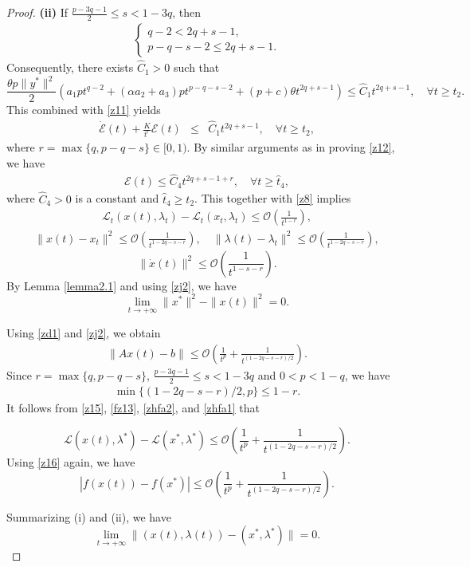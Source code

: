 \documentclass[review]{elsarticle}
\begin{document}
\begin{proof}
		{\bf (ii)} If $\frac{p-3q-1}{2}\leq s<1-3q$, then
		\begin{eqnarray*}
			\begin{cases}
				q-2<2q+s-1,\\
				p-q-s-2\leq2q+s-1.
			\end{cases}
		\end{eqnarray*} 
		Consequently, there exists $\widehat{C}_1>0$ such that
		$$\frac{\theta p\|y^*\|^2}{2}\left(a_1pt^{q-2}+(\alpha a_2+a_3)pt^{p-q-s-2}+(p+c)\theta t^{2q+s-1}\right)\leq \widehat{C}_1t^{2q+s-1}, \quad \forall t\geq t_2.$$
		This combined with \eqref{z11} yields 
		\begin{eqnarray*}
			\dot{\mathcal{E}}(t)+\frac{K}{t^r}\mathcal{E}(t)
			&\leq&\widehat{C}_1 t^{2q+s-1}, \quad \forall t\geq t_2,
		\end{eqnarray*}	
		where $r=\max\{q, p-q-s\}\in[0, 1)$.
		By   similar arguments as in proving \eqref{z12}, we  have 
		\begin{eqnarray*}
			\mathcal{E}(t)
			\leq\widehat{C}_4t^{2q+s-1+r}, \quad \forall t\geq \hat{t}_4,
		\end{eqnarray*}	
where $\widehat{C}_4>0$ is a constant and $\hat{t}_4\geq t_2$.
This together with \eqref{z8} implies 
		\begin{eqnarray}\label{fz13}
			\mathcal{L}_{t}(x(t),\lambda_t)-\mathcal{L}_{t}(x_t,\lambda_t)\leq\mathcal{O}\left(\frac{1}{t^{1-r}}\right),
		\end{eqnarray}	
		\begin{eqnarray}\label{zj2}
		\|x(t)-x_t\|^2\leq\mathcal{O}\left(\frac{1}{t^{1-2q-s-r}}\right), \quad\|\lambda(t)-\lambda_t\|^2\leq\mathcal{O}\left(\frac{1}{t^{1-2q-s-r}}\right),
    	\end{eqnarray}	
		$$\|\dot{x}(t)\|^2\leq\mathcal{O}\left(\frac{1}{t^{1-s-r}}\right).$$
By Lemma \ref{lemma2.1} and using  \eqref{zj2}, we have  
\begin{equation}\label{zhfa2}
\lim_{t\rightarrow+\infty}\|x^*\|^2-\|x(t)\|^2=0.
\end{equation}

		Using \eqref{zd1} and \eqref{zj2}, we  obtain 
		\begin{eqnarray}\label{zhfa1}
			\|Ax(t)-b\|\leq\mathcal{O}\left(\frac{1}{t^{p}}+\frac{1}{t^{(1-2q-s-r)/2}}\right).
		\end{eqnarray}
Since $r=\max\{q, p-q-s\}$, $\frac{p-3q-1}{2}\leq s<1-3q$ and $0<p<1-q$, we have
       \begin{eqnarray*}
       	       		\min\{(1-2q-s-r)/2,p\} \leq1-r.       	   
       \end{eqnarray*} 
It follows from  \eqref{z15}, \eqref{fz13}, \eqref{zhfa2}, and \eqref{zhfa1} that

$$\mathcal{L}(x(t),\lambda^*)-\mathcal{L}(x^*,\lambda^*)\leq\mathcal{O}\left(\frac{1}{t^{p}}+\frac{1}{t^{(1-2q-s-r)/2}}\right).$$     
Using \eqref{z16} again, we have
$$|f(x(t))-f(x^*)|\leq\mathcal{O}\left(\frac{1}{t^{p}}+\frac{1}{t^{(1-2q-s-r)/2}}\right).$$

	Summarizing (i) and (ii), we have
	$$\lim_{t\rightarrow+\infty}\|(x(t), \lambda(t))-(x^*,\lambda^*)\|=0.$$
	\end{proof}
	
\end{document}
